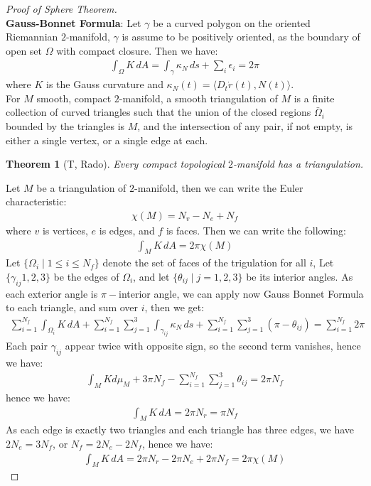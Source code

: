 \documentclass[11pt]{book}
\theoremstyle{break}
\theoremstyle{break}
\newtheorem{thm}{Theorem}[section]
\begin{document}
\begin{proof}[Proof of Sphere Theorem]${}$\\
\textbf{Gauss-Bonnet Formula}:
Let $\gamma$ be a curved polygon on the oriented Riemannian $2$-manifold, $\gamma$ is assume to be positively oriented, as the boundary of open set $\Omega$ with compact closure. Then we have:\begin{align*}
\int_\Omega K \, dA = \int_\gamma \kappa_N \, ds + \sum_i \epsilon_i  = 2\pi
\end{align*} 
where $K$ is the Gauss curvature and $\kappa_N(t) = \langle D_t \dot{r}(t), N(t) \rangle$. \\

For $M$ smooth, compact $2$-manifold, a smooth triangulation of $M$ is a finite collection of curved triangles such that the union of the closed regions $\bar{\Omega}_i$ bounded by the triangles is $M$, and the intersection of any pair, if not empty, is either a single vertex, or a single edge at each.\\

\begin{thm}[T, Rado]
Every compact topological $2$-manifold has a triangulation. 
\end{thm}

Let $M$ be a triangulation of $2$-manifold, then we can write the Euler characteristic:
\begin{align*}
\chi(M) = N_v - N_e + N_f
\end{align*}
where $v$ is vertices, $e$ is edges, and $f$ is faces. Then we can write the following:
\begin{align*}
\int_M K \, dA = 2\pi \chi(M) 
\end{align*}
Let $\{\Omega_i \mid 1\leq i \leq N_f\}$ denote the set of faces of the trigulation for all $i$, Let $\{\gamma_{ij}1,2,3\}$ be the edges of $\Omega_i$, and let $\{\theta_{ij}\mid j = 1,2,3\}$ be its interior angles. As each exterior angle is $\pi - $interior angle, we can apply now Gauss Bonnet Formula to each triangle, and sum over $i$,  then we get:
\begin{align*}
\sum_{i=1}^{N_f} \int_{\Omega_i}K \, dA + \sum_{i=1}^{N_f}\sum_{j=1}^3 \int_{\gamma_{ij}}\kappa_N \, ds + \sum_{i=1}^{N_f} \sum_{j=1}^3(\pi - \theta_{ij}) = \sum_{i=1}^{N_f} 2\pi
\end{align*}
Each pair $\gamma_{ij}$ appear twice with opposite sign, so the second term vanishes, hence we have:
\begin{align*}
\int_M K d\mu_M + 3\pi N_f - \sum_{i=1}^{N_f} \sum_{j=1}^3 \theta_{ij} = 2\pi N_f
\end{align*}
hence we have:
\begin{align*}
\int_M K \, dA = 2\pi N_r = \pi N_f
\end{align*}
As each edge is exactly two triangles and each triangle has three edges, we have $2N_e = 3N_f$, or $N_f = 2N_e - 2N_f$, hence we have:
\begin{align*}
\int_M K \, dA = 2\pi N_r - 2\pi N_e + 2\pi N_f = 2\pi \chi(M)
\end{align*}
\end{proof}
\end{document}
